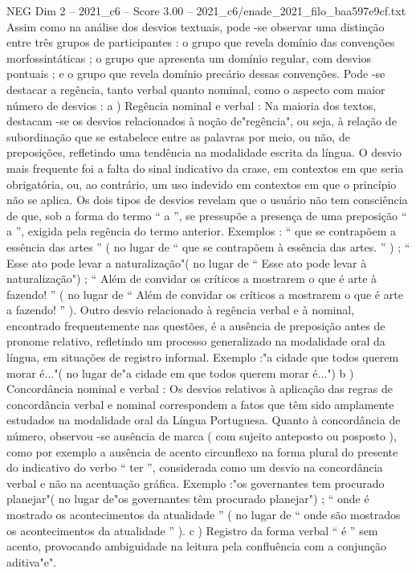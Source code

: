 \begin{textsample}{NEG Dim 2 – 2021\_c6 – Score 3.00 – 2021\_c6/enade\_2021\_filo\_baa597e9cf.txt}
Assim como na análise dos desvios textuais, pode -se observar uma distinção entre três grupos de participantes : o grupo que revela domínio das convenções morfossintáticas ; o grupo que apresenta um domínio regular, com desvios pontuais ; e o grupo que revela domínio precário dessas convenções.
Pode -se destacar a regência, tanto verbal quanto nominal, como o aspecto com maior número de desvios : a ) Regência nominal e verbal : Na maioria dos textos, destacam -se os desvios relacionados à noção de"regência", ou seja, à relação de subordinação que se estabelece entre as palavras por meio, ou não, de preposições, refletindo uma tendência na modalidade escrita da língua.
O desvio mais frequente foi a falta do sinal indicativo da crase, em contextos em que seria obrigatória, ou, ao contrário, um uso indevido em contextos em que o princípio não se aplica.
Os dois tipos de desvios revelam que o usuário não tem consciência de que, sob a forma do termo “ a ”, se pressupõe a presença de uma preposição “ a ”, exigida pela regência do termo anterior.
Exemplos : “ que se contrapõem a essência das artes ” ( no lugar de “ que se contrapõem à essência das artes. ” ) ; “ Esse ato pode levar a naturalização"( no lugar de “ Esse ato pode levar à naturalização") ; “ Além de convidar os críticos a mostrarem o que é arte à fazendo! ” ( no lugar de “ Além de convidar os críticos a mostrarem o que é arte a fazendo! ” ).
Outro desvio relacionado à regência verbal e à nominal, encontrado frequentemente nas questões, é a ausência de preposição antes de pronome relativo, refletindo um processo generalizado na modalidade oral da língua, em situações de registro informal.
Exemplo :"a cidade que todos querem morar é..."( no lugar de"a cidade em que todos querem morar é...") b ) Concordância nominal e verbal : Os desvios relativos à aplicação das regras de concordância verbal e nominal correspondem a fatos que têm sido amplamente estudados na modalidade oral da Língua Portuguesa.
Quanto à concordância de número, observou -se ausência de marca ( com sujeito anteposto ou posposto ), como por exemplo a ausência de acento circunflexo na forma plural do presente do indicativo do verbo “ ter ”, considerada como um desvio na concordância verbal e não na acentuação gráfica.
Exemplo :"os governantes tem procurado planejar"( no lugar de"os governantes têm procurado planejar") ; “ onde é mostrado os acontecimentos da atualidade ” ( no lugar de “ onde são mostrados os acontecimentos da atualidade ” ). c ) Registro da forma verbal “ é ” sem acento, provocando ambiguidade na leitura pela confluência com a conjunção aditiva"e".

\end{textsample}
